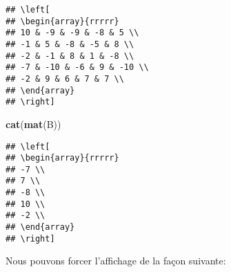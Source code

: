 \documentclass[]{article}
\newenvironment{Shaded}{\begin{snugshade}}{\end{snugshade}}
\newcommand{\KeywordTok}[1]{\textcolor[rgb]{0.13,0.29,0.53}{\textbf{#1}}}
\newcommand{\NormalTok}[1]{#1}
\begin{document}
\begin{verbatim}
## \left[
## \begin{array}{rrrrr}
## 10 & -9 & -9 & -8 & 5 \\ 
## -1 & 5 & -8 & -5 & 8 \\ 
## -2 & -1 & 8 & 1 & -8 \\ 
## -7 & -10 & -6 & 9 & -10 \\ 
## -2 & 9 & 6 & 7 & 7 \\ 
## \end{array}
## \right]
\end{verbatim}

\begin{Shaded}
\begin{Highlighting}[]
\KeywordTok{cat}\NormalTok{(}\KeywordTok{mat}\NormalTok{(B))}
\end{Highlighting}
\end{Shaded}

\begin{verbatim}
## \left[
## \begin{array}{rrrrr}
## -7 \\ 
## 7 \\ 
## -8 \\ 
## 10 \\ 
## -2 \\ 
## \end{array}
## \right]
\end{verbatim}

Nous pouvons forcer l'affichage de la façon suivante:
\end{document}

